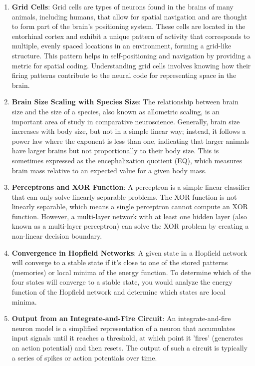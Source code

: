 \documentclass{article}
\begin{document}
\begin{enumerate}
    \item \textbf{Grid Cells}: Grid cells are types of neurons found in the brains of many animals, including humans, that allow for spatial navigation and are thought to form part of the brain's positioning system. These cells are located in the entorhinal cortex and exhibit a unique pattern of activity that corresponds to multiple, evenly spaced locations in an environment, forming a grid-like structure. This pattern helps in self-positioning and navigation by providing a metric for spatial coding. Understanding grid cells involves knowing how their firing patterns contribute to the neural code for representing space in the brain.

    \item \textbf{Brain Size Scaling with Species Size}: The relationship between brain size and the size of a species, also known as allometric scaling, is an important area of study in comparative neuroscience. Generally, brain size increases with body size, but not in a simple linear way; instead, it follows a power law where the exponent is less than one, indicating that larger animals have larger brains but not proportionally to their body size. This is sometimes expressed as the encephalization quotient (EQ), which measures brain mass relative to an expected value for a given body mass.

    \item \textbf{Perceptrons and XOR Function}: A perceptron is a simple linear classifier that can only solve linearly separable problems. The XOR function is not linearly separable, which means a single perceptron cannot compute an XOR function. However, a multi-layer network with at least one hidden layer (also known as a multi-layer perceptron) can solve the XOR problem by creating a non-linear decision boundary.

    \item \textbf{Convergence in Hopfield Networks}: A given state in a Hopfield network will converge to a stable state if it's close to one of the stored patterns (memories) or local minima of the energy function. To determine which of the four states will converge to a stable state, you would analyze the energy function of the Hopfield network and determine which states are local minima.

    \item \textbf{Output from an Integrate-and-Fire Circuit}: An integrate-and-fire neuron model is a simplified representation of a neuron that accumulates input signals until it reaches a threshold, at which point it 'fires' (generates an action potential) and then resets. The output of such a circuit is typically a series of spikes or action potentials over time.


\end{enumerate}
\end{document}
